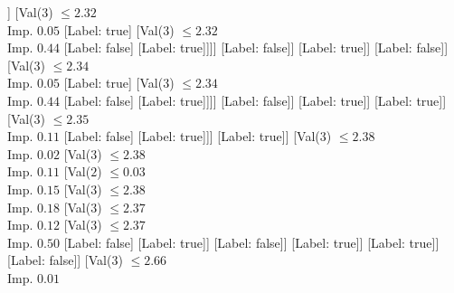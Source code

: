 \documentclass[margin=10pt]{standalone}
\begin{document}
\begin{forest}
														[Val($3$) $ \leq 2.35$ \\ Imp. $0.01$
															[Val($3$) $ \leq 2.34$ \\ Imp. $0.05$
																[Val($3$) $ \leq 2.33$ \\ Imp. $0.01$
																	[Val($3$) $ \leq 2.33$ \\ Imp. $0.08$
																		[Val($3$) $ \leq 2.33$ \\ Imp. $0.02$
																			[Val($3$) $ \leq 2.33$ \\ Imp. $0.10$
																				[Val($3$) $ \leq 2.32$ \\ Imp. $0.02$
																					[Val($3$) $ \leq 2.31$ \\ Imp. $0.44$
																						[Label: true]
																						[Label: false]]
																					[Val($3$) $ \leq 2.32$ \\ Imp. $0.05$
																						[Label: true]
																						[Val($3$) $ \leq 2.32$ \\ Imp. $0.44$
																							[Label: false]
																							[Label: true]]]]
																				[Label: false]]
																			[Label: true]]
																		[Label: false]]
																	[Val($3$) $ \leq 2.34$ \\ Imp. $0.05$
																		[Label: true]
																		[Val($3$) $ \leq 2.34$ \\ Imp. $0.44$
																			[Label: false]
																			[Label: true]]]]
																[Label: false]]
															[Label: true]]
														[Label: true]]
													[Val($3$) $ \leq 2.35$ \\ Imp. $0.11$
														[Label: false]
														[Label: true]]]
												[Label: true]]
											[Val($3$) $ \leq 2.38$ \\ Imp. $0.02$
												[Val($3$) $ \leq 2.38$ \\ Imp. $0.11$
													[Val($2$) $ \leq 0.03$ \\ Imp. $0.15$
														[Val($3$) $ \leq 2.38$ \\ Imp. $0.18$
															[Val($3$) $ \leq 2.37$ \\ Imp. $0.12$
																[Val($3$) $ \leq 2.37$ \\ Imp. $0.50$
																	[Label: false]
																	[Label: true]]
																[Label: false]]
															[Label: true]]
														[Label: true]]
													[Label: false]]
												[Val($3$) $ \leq 2.66$ \\ Imp. $0.01$

\end{forest}
\end{document}
